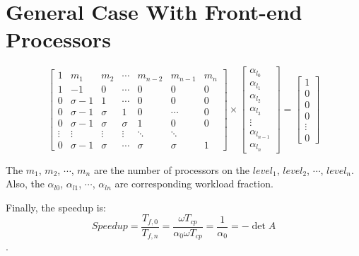 \section{General Case With Front-end Processors}
\begin{equation}
{
\left[ \begin{array}{ccccccc}
1 & m_{1} & m_{2} & \cdots & m_{n-2} & m_{n-1} & m_{n}\\
1 & -1 & 0 & \cdots& 0 & 0 & 0\\
0 & \sigma -1 & 1 & \cdots & 0 & 0 & 0 \\
0 & \sigma -1 & \sigma & 1 & 0 & \cdots & 0 \\
0 & \sigma -1 & \sigma & \sigma & 1 & 0 & 0 \\
\vdots & \vdots & \vdots  &   \vdots & \ddots & \ddots\\
0 & \sigma -1 & \sigma & \cdots & \sigma & \sigma & 1
\end{array} 
\right ]} \times \left[ \begin{array}{c}
\alpha_{l_{0}} \\
\alpha_{l_{1}} \\
\alpha_{l_{2}} \\
\alpha_{l_{3}} \\
\vdots \\
\alpha_{l_{n-1}}\\
\alpha_{l_{n}}
\end{array} 
\right ] = \left[ \begin{array}{c}
1 \\
0 \\
0 \\
0 \\
\vdots \\
0
\end{array} 
\right ]
\end{equation}

The $m_{1}$, $m_{2}$, $\cdots$, $m_{n}$ are the number of processors on the $level_{1}$, $level_{2}$, $\cdots$, $level_{n}$.   Also, the $\alpha_{l0}$, $\alpha_{l1}$,  $\cdots$, $\alpha_{ln}$ are corresponding workload fraction.  

Finally, the speedup is:
$$Speedup = \frac{T_{f, 0}}{T_{f, n}}= \frac{\omega T_{cp}}{\alpha_{0}\omega T_{cp}} = \frac{1}{\alpha_{0}} = -\det A$$.
\newpage 

